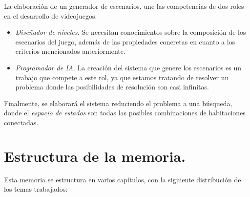 La elaboración de un generador de escenarios, une las competencias de dos roles en el desarrollo de videojuegos:

\begin{itemize}
	\item \emph{Diseñador de niveles.} Se necesitan conocimientos sobre la composición de los escenarios del juego, además de las propiedades concretas en cuanto a los criterios mencionados anteriormente.
	\item \emph{Programador de IA}. La creación del sistema que genere los escenarios es un trabajo que compete a este rol, ya que estamos tratando de resolver un problema donde las posibilidades de resolución son casi infinitas.
\end{itemize}

Finalmente, se elaborará el sistema reduciendo el problema a una búsqueda, donde el \emph{espacio de estados} son todas las posibles combinaciones de habitaciones conectadas.

\section*{Estructura de la memoria.}

Esta memoria se estructura en varios capítulos, con la siguiente distribución de los temas trabajados:

